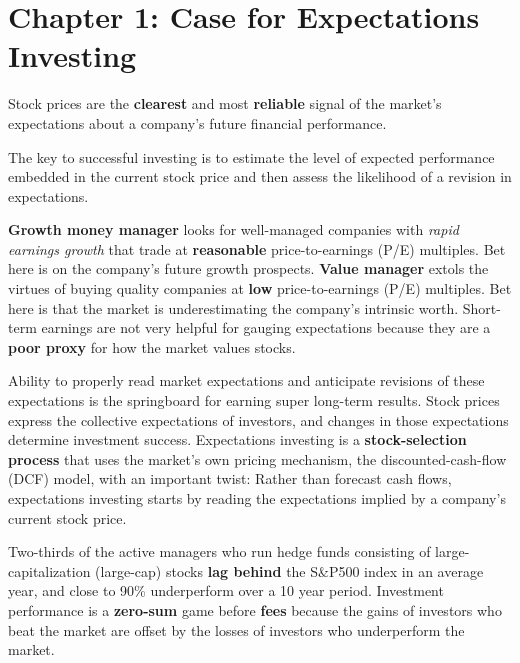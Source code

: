\documentclass[english,titlepage]{article}
\begin{document}
\section{Chapter 1: Case for Expectations Investing}
Stock prices are the \textbf{clearest} and most \textbf{reliable} signal of the market's expectations about a company's future financial performance. 
\begin{tcolorbox}[colback=blue!5!white,colframe=blue!75!black]
    The key to successful investing is to estimate the level of expected performance embedded in the current stock price and then assess the likelihood of a revision in expectations. 
\end{tcolorbox}
  \textbf{Growth money manager} looks for well-managed companies with \emph{rapid earnings growth} that trade at \textbf{reasonable} price-to-earnings (P/E) multiples. Bet here is on the company's future growth prospects. 
  \vspace {0.3 cm}
  \newline \textbf{Value manager} extols the virtues of buying quality companies at \textbf{low} price-to-earnings (P/E) multiples. Bet here is that the market is underestimating the company's intrinsic worth. 
  \vspace {0.3 cm}
  \newline Short-term earnings are not very helpful for gauging expectations because they are a \textbf{poor proxy} for how the market values stocks. 
  \begin{tcolorbox}[colback=blue!5!white,colframe=blue!75!black]
   Ability to properly read market expectations and anticipate revisions of these expectations is the springboard for earning super long-term results. \vspace {0.3 cm}
   \newline Stock prices express the collective expectations of investors, and changes in those expectations determine investment success. 
  \vspace {0.3 cm}
  \newline Expectations investing is a \textbf{stock-selection process} that uses the market's own pricing mechanism, the discounted-cash-flow (DCF) model, with an important twist: Rather than forecast cash flows, expectations investing starts by reading the expectations implied by a company's current stock price. 
  \end{tcolorbox}
Two-thirds of the active managers who run hedge funds consisting of large-capitalization (large-cap) stocks \textbf{lag behind} the S\&P500 index in an average year, and close to 90\% underperform over a 10 year period. \vspace {0.3 cm}
\newline Investment performance is a \textbf{zero-sum} game before \textbf{fees} because the gains of investors who beat the market are offset by the losses of investors who underperform the market. \vspace {0.3 cm}
\end{document}
